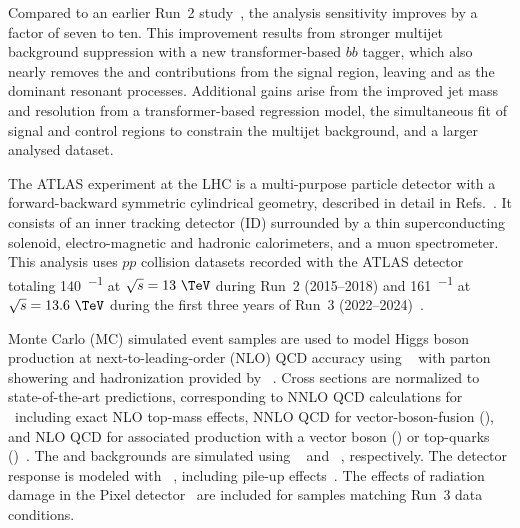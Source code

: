 \documentclass[PAPER, cernpreprint=true, atlasdraft=false, UKenglish, texmf, orcidlogo]{atlasdoc}
\begin{document}
Compared to an earlier Run~2 study~\cite{HIGG-2021-08}, the analysis sensitivity improves by a factor of seven to ten.
This improvement results from stronger multijet background suppression with a new transformer-based $bb$ tagger, which also nearly removes the \Wqq and \ttbar contributions from the signal region, leaving \Zbb and \Hbb as the dominant resonant processes.
Additional gains arise from the improved jet mass and \pT resolution from a transformer-based regression model, the simultaneous fit of signal and control regions to constrain the multijet background, and a larger analysed dataset.









The ATLAS experiment at the LHC is a multi-purpose particle detector with a forward-backward symmetric cylindrical geometry, described in detail in Refs.~\cite{PERF-2007-01,GENR-2019-02}. It consists of an inner tracking detector (ID) surrounded by a thin superconducting solenoid, electro-magnetic and hadronic calorimeters, and a muon spectrometer.
This analysis uses $pp$ collision datasets recorded with the ATLAS detector totaling \SI{140}{\fb^{-1}} at $\sqrt{s}=13~\TeV$ during Run~2 (2015--2018) and \SI{161}{\fb^{-1}} at $\sqrt{s}=13.6~\TeV$ during the first three years of Run~3 (2022--2024)~\cite{DAPR-2021-01,ATL-DAPR-PUB-2024-001,ATL-DAPR-PUB-2025-001}.

Monte Carlo (MC) simulated event samples are used to model Higgs boson production at next-to-leading-order (NLO) QCD accuracy using \POWHEGBOX~\cite{Alioli:2010xd,Nason:2004rx,Frixione:2007vw} with parton showering and hadronization provided by \PYTHIA[8]~\cite{Sjostrand:2014zea}. Cross sections are normalized to state-of-the-art predictions, corresponding to NNLO QCD calculations for \ggF\ including exact NLO top-mass effects, NNLO QCD for vector-boson-fusion (\VBF), and NLO QCD for associated production with a vector boson (\VH) or top-quarks (\ttH)~\cite{Becker:2020rjp}.
The \Vjets and \ttbar backgrounds are simulated using \SHERPA[2.2.14]~\cite{Bothmann:2019yzt} and \POWHEGBOX~\cite{Frixione:2007nw,Nason:2004rx,Frixione:2007vw,Alioli:2010xd}, respectively. The detector response is modeled with \GEANT~\cite{Agostinelli:2002hh}, including pile-up effects~\cite{ATL-PHYS-PUB-2016-017}. The effects of radiation damage in the Pixel detector~\cite{IDET-2017-10,PIXE-2023-02} are included for samples matching Run~3 data conditions.
\end{document}
